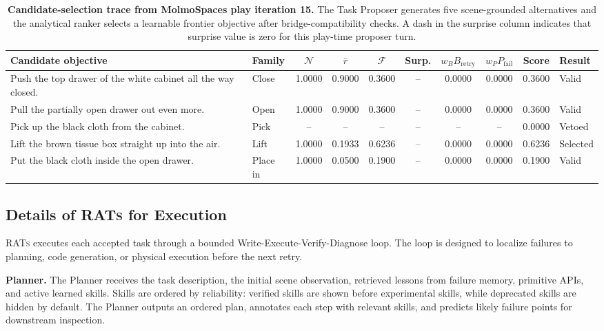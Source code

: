 \documentclass{llmxive}
\begin{document}
\begin{table}[t]
\centering
\scriptsize
\setlength{\tabcolsep}{4pt}
\vspace{1.5em}
\begin{tabular}{p{} l c c c c c c c p{}}
\toprule
\textbf{Candidate objective} & \textbf{Family} & $\mathcal{N}$ & $\bar{r}$ &
$\mathcal{F}$ & \textbf{Surp.} & $w_BB_{\mathrm{retry}}$ &
$w_PP_{\mathrm{fail}}$ & \textbf{Score} & \textbf{Result} \\
\midrule
Push the top drawer of the white cabinet all the way closed. & Close & 1.0000 & 0.9000 & 0.3600 & -- & 0.0000 & 0.0000 & 0.3600 & Valid \\
Pull the partially open drawer out even more. & Open & 1.0000 & 0.9000 & 0.3600 & -- & 0.0000 & 0.0000 & 0.3600 & Valid \\
Pick up the black cloth from the cabinet. & Pick & -- & -- & -- & -- & -- & -- & 0.0000 & Vetoed \\
Lift the brown tissue box straight up into the air. & Lift & 1.0000 & 0.1933 & 0.6236 & -- & 0.0000 & 0.0000 & 0.6236 & Selected \\
Put the black cloth inside the open drawer. & Place in & 1.0000 & 0.0500 & 0.1900 & -- & 0.0000 & 0.0000 & 0.1900 & Valid \\
\bottomrule
\end{tabular}
\caption{
\textbf{Candidate-selection trace from MolmoSpaces play iteration 15.}
The Task Proposer generates five scene-grounded alternatives and the analytical
ranker selects a learnable frontier objective after bridge-compatibility
checks. A dash in the surprise column indicates that surprise
value is zero for this play-time proposer turn.
}
\label{tab:proposal_selection_example}
\end{table}

\subsection{Details of \textsc{RATs} for Execution}
\label{sec:appendix_execution}

\textsc{RATs} executes each accepted task through a bounded
Write-Execute-Verify-Diagnose loop. The loop is designed to localize failures
to planning, code generation, or physical execution before the next retry.

\textbf{Planner.}
The Planner receives the task description, the initial scene observation,
retrieved lessons from failure memory, primitive APIs, and active learned
skills. Skills are ordered by reliability: verified skills are shown before
experimental skills, while deprecated skills are hidden by default. The Planner
outputs an ordered plan, annotates each step with relevant skills, and predicts
likely failure points for downstream inspection.
\end{document}
